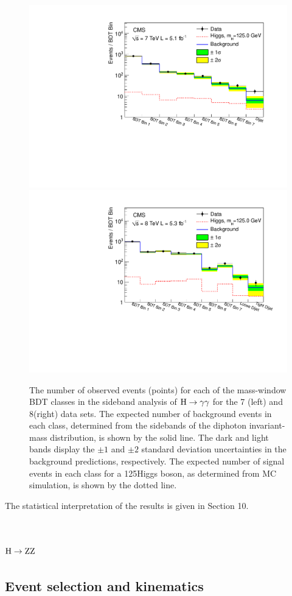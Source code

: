\documentclass[12pt,twoside,a4paper,cmspaper,final,collab]{cms-tdr}
\begin{document}
\begin{figure}[htbp]
  \begin{center}
    \includegraphics[width=0.49\linewidth]{figures/hgg_MassWindow_model_m125}
    \includegraphics[width=0.49\linewidth]{figures/hgg_MassWindow_model_m125_8TeV}
    \caption{The number of observed events (points) for each of the mass-window BDT classes in the sideband analysis of
      $\mathrm{H} \to \gamma\gamma$ for the 7 (left) and 8\TeV (right) data sets. The expected number of background events in
       each class, determined from the sidebands of the diphoton invariant-mass distribution, is shown by the solid line.
         The dark and light bands display the ${\pm}1$ and ${\pm}2$ standard deviation uncertainties in the background predictions,
         respectively. The expected number of signal events in each class for a 125\GeV Higgs boson, as determined from MC simulation,
         is shown by the dotted line.
    }
    \label{fig:hgg_MassWindowModel}
  \end{center}
\end{figure}

The statistical interpretation of the results is given in Section 10.










\section{\texorpdfstring{$\mathrm{H}\to\mathrm{Z}\mathrm{Z}$}{H to ZZ}\label{sec:hzz4l}}
\subsection{Event selection and kinematics}
\end{document}
